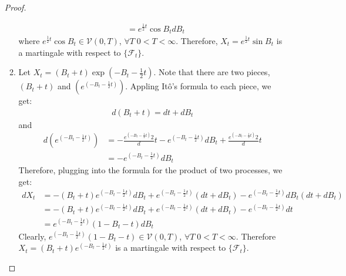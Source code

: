 \documentclass[11pt]{article}
\newcommand{\fcal}{\mathcal{F}}
\newcommand{\seq}[1]{\{#1\}}
\begin{document}
\begin{enumerate}
\begin{proof}
\begin{enumerate}
\begin{align*}
&=e^{\frac{1}{2} t}  \cos B_t dB_t 
\end{align*}
where $e^{\frac{1}{2} t}  \cos B_t \in \mathcal{V}(0,T)$, $\forall T \; 0<T < \infty$.  Therefore, $X_t=e^{\frac{1}{2} t} \sin B_t$ is a martingale with respect to $\seq{\fcal_t}$.
\item Let $X_t = (B_t+t) \exp (-B_t -\frac{1}{2}t)$.  Note that there are two pieces, $(B_t+t)$ and $(e^{(-B_t -\frac{1}{2}t)})$.
Appling It\^o's formula to each piece, we get:
\begin{align*}
d(B_t+t) = dt+dB_t
\end{align*}
and
\begin{align*}
d( e^{(-B_t -\frac{1}{2}t)}) &= -\frac{ e^{(-B_t -\frac{1}{2}t)}{2}} dt -  e^{(-B_t -\frac{1}{2}t)} d B_t + \frac{ e^{(-B_t -\frac{1}{2}t)}{2} }dt\\
&= -  e^{(-B_t -\frac{1}{2}t)} d B_t 
\end{align*}
Therefore, plugging into the formula for the product of two processes, we get:
\begin{align*}
dX_t& = -(B_t+t)  e^{(-B_t -\frac{1}{2}t)} d B_t + e^{(-B_t -\frac{1}{2}t)}(dt+dB_t) - e^{(-B_t -\frac{1}{2}t)} d B_t (dt+dB_t)\\
& = -(B_t+t)  e^{(-B_t -\frac{1}{2}t)} d B_t + e^{(-B_t -\frac{1}{2}t)}(dt+dB_t)-e^{(-B_t -\frac{1}{2}t)} dt\\
&=e^{(-B_t -\frac{1}{2}t)}(1-B_t-t)dB_t
\end{align*}
Clearly, $e^{(-B_t -\frac{1}{2}t)}(1-B_t-t) \in \mathcal{V}(0,T)$, $\forall T \; 0<T < \infty$.  Therefore $X_t = (B_t+t) e^{(-B_t -\frac{1}{2}t)}$ is a martingale with respect to $\seq{\fcal_t}$.
\end{enumerate}
\end{proof}
\end{enumerate}

 
\end{document}
